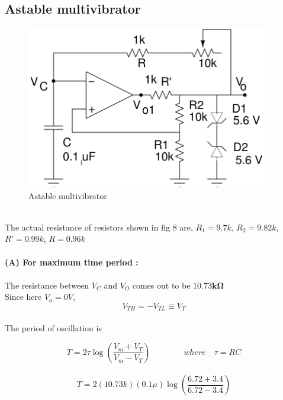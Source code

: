 \documentclass[12pt]{article}
\begin{document}
\subsection{Astable multivibrator}
      \begin{figure}[H]
            \centering
            \includegraphics[width = 0.5\linewidth, height = 2.8in]{reports/lab2/astable.png}
            \caption{Astable multivibrator}
        \end{figure}
        \\
        The actual resistance of resistors shown in fig 8 are,
        $R_1 = 9.7k$, $R_2 = 9.82k$, $R' = 0.99k$, $R = 0.96k$\\
        \\
        \textbf{(A) For maximum time period :}\\
        \\
        The resistance between $V_C$ and $V_O$ comes out to be $\mathbf{10.73k \Omega}$
        \\
        Since here $V_a = 0V$,
        \begin{equation}
            V_{TH} = -V_{TL} \equiv V_{T}
        \end{equation}
        \\
        The period of oscillation is
        
        \begin{equation}
            T = 2\tau \log(\frac{V_m + V_T}{V_m - V_T}) \qquad \qquad where \quad \tau = RC
        \end{equation}
        \\
        \begin{equation}
            T = 2(10.73k)(0.1\mu) \log(\frac{6.72 + 3.4}{6.72 - 3.4})
        \end{equation}
        
\end{document}
